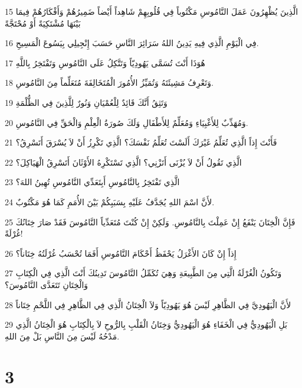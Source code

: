 \par 15 الَّذِينَ يُظْهِرُونَ عَمَلَ النَّامُوسِ مَكْتُوباً فِي قُلُوبِهِمْ شَاهِداً أَيْضاً ضَمِيرُهُمْ وَأَفْكَارُهُمْ فِيمَا بَيْنَهَا مُشْتَكِيَةً أَوْ مُحْتَجَّةً
\par 16 فِي الْيَوْمِ الَّذِي فِيهِ يَدِينُ اللهُ سَرَائِرَ النَّاسِ حَسَبَ إِنْجِيلِي بِيَسُوعَ الْمَسِيحِ.
\par 17 هُوَذَا أَنْتَ تُسَمَّى يَهُودِيّاً وَتَتَّكِلُ عَلَى النَّامُوسِ وَتَفْتَخِرُ بِاللَّهِ
\par 18 وَتَعْرِفُ مَشِيئَتَهُ وَتُمَيِّزُ الأُمُورَ الْمُتَخَالِفَةَ مُتَعَلِّماً مِنَ النَّامُوسِ.
\par 19 وَتَثِقُ أَنَّكَ قَائِدٌ لِلْعُمْيَانِ وَنُورٌ لِلَّذِينَ فِي الظُّلْمَةِ
\par 20 وَمُهَذِّبٌ لِلأَغْبِيَاءِ وَمُعَلِّمٌ لِلأَطْفَالِ وَلَكَ صُورَةُ الْعِلْمِ وَالْحَقِّ فِي النَّامُوسِ.
\par 21 فَأَنْتَ إِذاً الَّذِي تُعَلِّمُ غَيْرَكَ أَلَسْتَ تُعَلِّمُ نَفْسَكَ؟ الَّذِي تَكْرِزُ أَنْ لاَ يُسْرَقَ أَتَسْرِقُ؟
\par 22 الَّذِي تَقُولُ أَنْ لاَ يُزْنَى أَتَزْنِي؟ الَّذِي تَسْتَكْرِهُ الأَوْثَانَ أَتَسْرِقُ الْهَيَاكِلَ؟
\par 23 الَّذِي تَفْتَخِرُ بِالنَّامُوسِ أَبِتَعَدِّي النَّامُوسِ تُهِينُ اللهَ؟
\par 24 لأَنَّ اسْمَ اللهِ يُجَدَّفُ عَلَيْهِ بِسَبَبِكُمْ بَيْنَ الأُمَمِ كَمَا هُوَ مَكْتُوبٌ.
\par 25 فَإِنَّ الْخِتَانَ يَنْفَعُ إِنْ عَمِلْتَ بِالنَّامُوسِ. وَلَكِنْ إِنْ كُنْتَ مُتَعَدِّياً النَّامُوسَ فَقَدْ صَارَ خِتَانُكَ غُرْلَةً!
\par 26 إِذاً إِنْ كَانَ الأَغْرَلُ يَحْفَظُ أَحْكَامَ النَّامُوسِ أَفَمَا تُحْسَبُ غُرْلَتُهُ خِتَاناً؟
\par 27 وَتَكُونُ الْغُرْلَةُ الَّتِي مِنَ الطَّبِيعَةِ وَهِيَ تُكَمِّلُ النَّامُوسَ تَدِينُكَ أَنْتَ الَّذِي فِي الْكِتَابِ وَالْخِتَانِ تَتَعَدَّى النَّامُوسَ؟
\par 28 لأَنَّ الْيَهُودِيَّ فِي الظَّاهِرِ لَيْسَ هُوَ يَهُودِيّاً وَلاَ الْخِتَانُ الَّذِي فِي الظَّاهِرِ فِي اللَّحْمِ خِتَاناً
\par 29 بَلِ الْيَهُودِيُّ فِي الْخَفَاءِ هُوَ الْيَهُودِيُّ وَخِتَانُ الْقَلْبِ بِالرُّوحِ لاَ بِالْكِتَابِ هُوَ الْخِتَانُ الَّذِي مَدْحُهُ لَيْسَ مِنَ النَّاسِ بَلْ مِنَ اللهِ.

\chapter{3}

